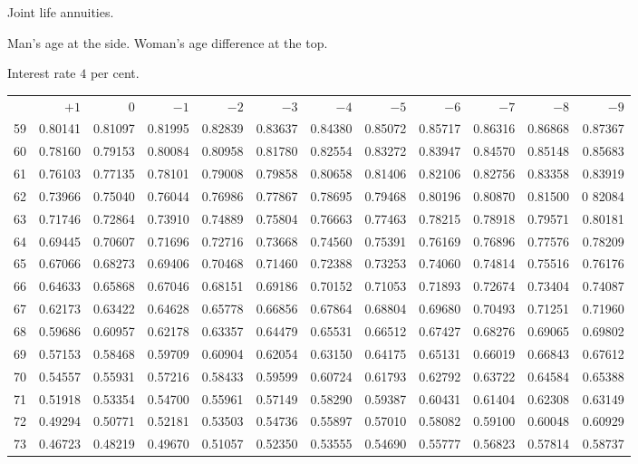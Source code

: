 \clearpage
{}
\begin{center}
Joint life annuities.\par\smallskip
Man's age at the side. Woman's age difference at the top.\par\smallskip
Interest rate \(4\) per cent.\par\medskip
\fontsize{8}{10}\selectfont\setlength{\tabcolsep}{1.3pt}
\begin{tabular}{|r|rrrrrrrrrrr|}
\hline
&\(+1\)&0&\(-1\)&\(-2\)&\(-3\)&\(-4\)&\(-5\)&\(-6\)&\(-7\)&\(-8\)&\(-9\)\\[8pt]
59&0.80141&0.81097&0.81995&0.82839&0.83637&0.84380&0.85072&0.85717&0.86316&0.86868&0.87367\\
60&0.78160&0.79153&0.80084&0.80958&0.81780&0.82554&0.83272&0.83947&0.84570&0.85148&0.85683\\
61&0.76103&0.77135&0.78101&0.79008&0.79858&0.80658&0.81406&0.82106&0.82756&0.83358&0.83919\\
62&0.73966&0.75040&0.76044&0.76986&0.77867&0.78695&0.79468&0.80196&0.80870&0.81500&0 82084\\
63&0.71746&0.72864&0.73910&0.74889&0.75804&0.76663&0.77463&0.78215&0.78918&0.79571&0.80181\\
64&0.69445&0.70607&0.71696&0.72716&0.73668&0.74560&0.75391&0.76169&0.76896&0.77576&0.78209\\[5pt]
65&0.67066&0.68273&0.69406&0.70468&0.71460&0.72388&0.73253&0.74060&0.74814&0.75516&0.76176\\
66&0.64633&0.65868&0.67046&0.68151&0.69186&0.70152&0.71053&0.71893&0.72674&0.73404&0.74087\\
67&0.62173&0.63422&0.64628&0.65778&0.66856&0.67864&0.68804&0.69680&0.70493&0.71251&0.71960\\
68&0.59686&0.60957&0.62178&0.63357&0.64479&0.65531&0.66512&0.67427&0.68276&0.69065&0.69802\\
69&0.57153&0.58468&0.59709&0.60904&0.62054&0.63150&0.64175&0.65131&0.66019&0.66843&0.67612\\[5pt]
70&0.54557&0.55931&0.57216&0.58433&0.59599&0.60724&0.61793&0.62792&0.63722&0.64584&0.65388\\
71&0.51918&0.53354&0.54700&0.55961&0.57149&0.58290&0.59387&0.60431&0.61404&0.62308&0.63149\\
72&0.49294&0.50771&0.52181&0.53503&0.54736&0.55897&0.57010&0.58082&0.59100&0.60048&0.60929\\
73&0.46723&0.48219&0.49670&0.51057&0.52350&0.53555&0.54690&0.55777&0.56823&0.57814&0.58737\\

\end{tabular}
\end{center}
